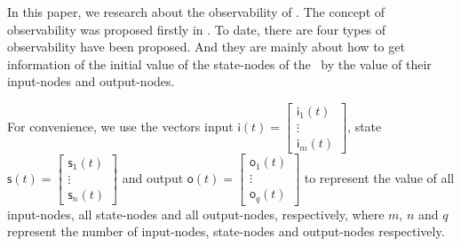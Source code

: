 
In this paper, we research about the observability of \BCNs. The concept of observability was proposed firstly in \cite{cheng2009controllability}. To date, there are four types of observability have been proposed. And they are mainly about how to get  information of the initial value of the state-nodes of the \BCNs\ by the value of their input-nodes and output-nodes. 

For convenience, we use the vectors input $\mathsf{i}(t)=\begin{bmatrix}\mathsf{i}_1(t)\\ \vdots \\\mathsf{i}_m(t)\end{bmatrix}$, state $\mathsf{s}(t)=\begin{bmatrix}\mathsf{s}_1(t)\\ \vdots \\\mathsf{s}_n(t)\end{bmatrix}$ and output $\mathsf{o}(t)=\begin{bmatrix}\mathsf{o}_1(t)\\ \vdots \\\mathsf{o}_q(t)\end{bmatrix}$ to represent the value of all input-nodes, all state-nodes and all output-nodes, respectively, where $m$, $n$ and $q$ represent the number of input-nodes, state-nodes and output-nodes respectively. 
 
